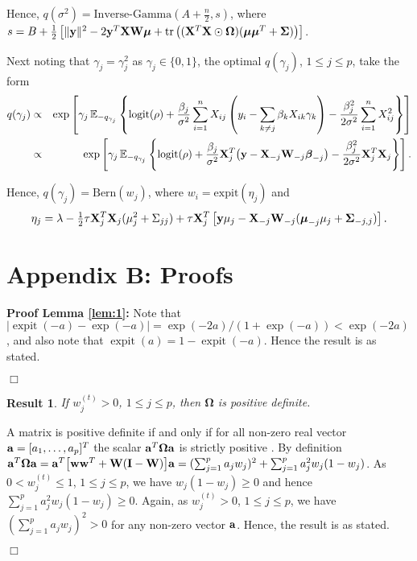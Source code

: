 \documentclass[11pt]{article}
\newtheorem{Result}{Result}
\newtheorem{Main Result}{Main Result}
\def\vectorfontone{\bf}
\def\vectorfonttwo{\boldsymbol}
\def\va{{\vectorfontone a}}                      %
\def\vw{{\vectorfontone w}}                      %
\def\vy{{\vectorfontone y}}                      %
\def\vbeta{{\vectorfonttwo \beta}}               %
\def\vmu{{\vectorfonttwo \mu}}                   %
\def\matrixfontone{\bf}
\def\matrixfonttwo{\boldsymbol}
\def\mI{{\matrixfontone I}}                      %
\def\mW{{\matrixfontone W}}                      %
\def\mX{{\matrixfontone X}}                      %
\def\mSigma{{\matrixfonttwo \Sigma}}             %
\def\mOmega{{\matrixfonttwo \Omega}}             %
\def\bE{{\mathbb E}}                             %
\def\tr{\text{tr}}
\DeclareMathOperator{\expit}{expit}
\begin{document}
{\noindent Hence,
$q(\sigma^2) = \mbox{Inverse-Gamma}(A+\tfrac{n}{2},s)$, where
$s = B + \frac{1}{2}\left[
\|\vy\|^2 - 2\vy^T \mX\mW\vmu
+\tr\left( (\mX^T\mX\odot\mOmega)(\vmu\vmu^T + \mSigma) \right)\right]
$.

\noindent Next noting that $\gamma_j=\gamma_j^2$ as $\gamma_j\in\{0,1\}$, the optimal $q(\gamma_j)$, $1\le j\le p$, take  the form
\begin{eqnarray*}
q(\gamma_j)
	& \propto 
	& \exp\left[ \gamma_j\,\bE_{-q_{\gamma_j}}\left\{
	\mbox{logit}(\rho)
	+\frac{\beta_j}{\sigma^2}\sum_{i=1}^n X_{ij}\left(y_i-\sum_{k\neq j}\beta_k X_{ik}\gamma_k\right)
	-\frac{\beta_j^2}{2\sigma^2}\sum_{i=1}^n  X_{ij}^2\right\}\right]\\
	& \propto
	& \exp\left[\gamma_j\,\bE_{-q_{\gamma_j}}\left\{
	\mbox{logit}(\rho)
	+\frac{\beta_j}{\sigma^2}\mX_j^T \big(\vy-\mX_{-j}\mW_{-j}\vbeta_{-j}\big)
	-\frac{\beta_j^2}{2\sigma^2}\mX_j^T \mX_j\right\}\right].
\end{eqnarray*}

\noindent Hence, $q(\gamma_j)=\mbox{Bern}(w_j)$, where $w_i=\mbox{expit}(\eta_j)$ and 
$$
\eta_j=\lambda -\tfrac{1}{2}\tau\mX_j^T\mX_j(\mu_j^2+\Sigma_{jj})
+
\tau\mX^T_j\left[\vy\mu_j-\mX_{-j}\mW_{-j}(\vmu_{-j}\mu_j + \mSigma_{-j,j})\right].
$$

 
}

\newpage

\section*{Appendix B: Proofs}\label{sec:minor}


\noindent
{\bf Proof Lemma \ref{lem:1}:}
Note that $|\expit(-a)-\exp(-a)|=\exp(-2a)/(1+\exp(-a))<\exp(-2a)$, and also
note that $\expit(a)=1-\expit(-a)$. Hence the result is as stated.
\vspace{-0.5cm}\begin{flushright}$\Box$\end{flushright}


\begin{Result}\label{res:1}
	If $w_j^{(t)}>0$, $1\le j\le p$, then $\mOmega$ is positive definite.
\end{Result}

 A matrix is positive definite if and only if
for all non-zero real vector $\va = [a_1,\ldots,a_p]^T$ the scalar $\va^T\mOmega\va$
is strictly positive \citep[Section 7.1]{Horn2012}. By definition
$\va^T\mOmega\va = \va^T\big[\vw\vw^T + \mW(\mI - \mW)\big]\va
=(\sum_{j=1}^p a_j w_j)^2 + \sum_{j=1}^p a_j^2w_j(1 - w_j)$.
As $ 0 < w_j^{(t)}\leq 1$, $1\le j\le p$, we have $w_j(1 - w_j)\geq 0$ and hence
$\sum_{j=1}^p a_j^2w_j(1 - w_j)\geq0$. Again, as $w_j^{(t)}>0$, $1\le j\le p$, we have $(\sum_{j=1}^p a_j w_j)^2>0$ for any non-zero vector $\va$. Hence, the result is as stated.
\vspace{-0.5cm}\begin{flushright}$\Box$\end{flushright}
\end{document}
